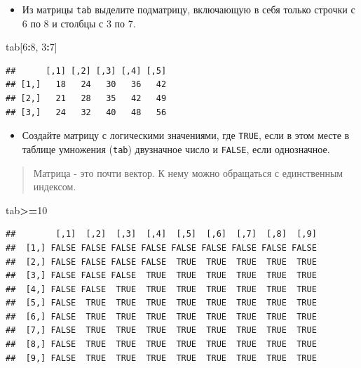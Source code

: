 \documentclass[]{book}
\newenvironment{Shaded}{\begin{snugshade}}{\end{snugshade}}
\newcommand{\CommentTok}[1]{\textcolor[rgb]{0.56,0.35,0.01}{\textit{#1}}}
\newcommand{\DecValTok}[1]{\textcolor[rgb]{0.00,0.00,0.81}{#1}}
\newcommand{\NormalTok}[1]{#1}
\newcommand{\OperatorTok}[1]{\textcolor[rgb]{0.81,0.36,0.00}{\textbf{#1}}}
\providecommand{\tightlist}{%
  \setlength{\itemsep}{0pt}\setlength{\parskip}{0pt}}
\begin{document}
\begin{Shaded}
\end{Shaded}

\begin{itemize}
\tightlist
\item
  Из матрицы \texttt{tab} выделите подматрицу, включающую в себя только строчки с 6 по 8 и столбцы с 3 по 7.
\end{itemize}

\begin{Shaded}
\begin{Highlighting}[]
\NormalTok{tab[}\DecValTok{6}\OperatorTok{:}\DecValTok{8}\NormalTok{, }\DecValTok{3}\OperatorTok{:}\DecValTok{7}\NormalTok{]}
\end{Highlighting}
\end{Shaded}

\begin{verbatim}
##      [,1] [,2] [,3] [,4] [,5]
## [1,]   18   24   30   36   42
## [2,]   21   28   35   42   49
## [3,]   24   32   40   48   56
\end{verbatim}

\begin{itemize}
\tightlist
\item
  Создайте матрицу с логическими значениями, где \texttt{TRUE}, если в этом месте в таблице умножения (\texttt{tab}) двузначное число и \texttt{FALSE}, если однозначное.
\end{itemize}

\begin{quote}
Матрица - это почти вектор. К нему можно обращаться с единственным индексом.
\end{quote}

\begin{Shaded}
\begin{Highlighting}[]
\NormalTok{tab}\OperatorTok{>=}\DecValTok{10}
\end{Highlighting}
\end{Shaded}

\begin{verbatim}
##        [,1]  [,2]  [,3]  [,4]  [,5]  [,6]  [,7]  [,8]  [,9]
##  [1,] FALSE FALSE FALSE FALSE FALSE FALSE FALSE FALSE FALSE
##  [2,] FALSE FALSE FALSE FALSE  TRUE  TRUE  TRUE  TRUE  TRUE
##  [3,] FALSE FALSE FALSE  TRUE  TRUE  TRUE  TRUE  TRUE  TRUE
##  [4,] FALSE FALSE  TRUE  TRUE  TRUE  TRUE  TRUE  TRUE  TRUE
##  [5,] FALSE  TRUE  TRUE  TRUE  TRUE  TRUE  TRUE  TRUE  TRUE
##  [6,] FALSE  TRUE  TRUE  TRUE  TRUE  TRUE  TRUE  TRUE  TRUE
##  [7,] FALSE  TRUE  TRUE  TRUE  TRUE  TRUE  TRUE  TRUE  TRUE
##  [8,] FALSE  TRUE  TRUE  TRUE  TRUE  TRUE  TRUE  TRUE  TRUE
##  [9,] FALSE  TRUE  TRUE  TRUE  TRUE  TRUE  TRUE  TRUE  TRUE
\end{verbatim}
\end{document}
